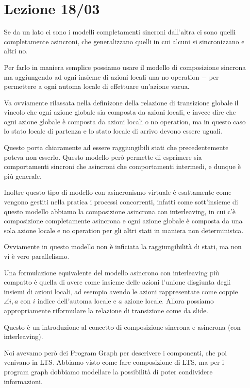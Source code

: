 \chapter{Lezione 18/03}

Se da un lato ci sono i modelli completamenti sincroni dall'altra ci sono quelli completamente asincroni, che generalizzano quelli in cui alcuni si sincronizzano e altri no.

Per farlo in maniera semplice possiamo usare il modello di composizione sincrona ma aggiungendo ad ogni insieme di azioni locali una no operation \(-\) per permettere a ogni automa locale di effettuare un'azione vacua.

Va ovviamente rilassata nella definizone della relazione di transizione globale il vincolo che ogni azione globale sia composta da azioni locali, e invece dire che ogni azione globale è composta da azioni locali o no operation, ma in questo caso lo stato locale di partenza e lo stato locale di arrivo devono essere uguali.

Questo porta chiaramente ad essere raggiungibili stati che precedentemente poteva non esserlo. Questo modello però permette di esprimere sia comportamenti sincroni che asincroni che comportamenti intermedi, e dunque è più generale.

Inoltre questo tipo di modello con asincronismo virtuale è esattamente come vengono gestiti nella pratica i processi concorrenti, infatti come sott'insieme di questo modello abbiamo la composizione asincrona con interleaving, in cui c'è composizione completamente asincrona e ogni azione globale è composta da una sola azione locale e no operation per gli altri stati in maniera non deterministca.

Ovviamente in questo modello non è inficiata la raggiungibilità di stati, ma non vi è vero parallelismo.


Una formulazione equivalente del modello asincrono con interleaving più compatto è quella di avere come insieme delle azioni l'unione disgiunta degli insiemi di azioni locali, ad esempio avendo le azioni rappresentate come coppie \(\angle{i,a}\) con \(i\) indice dell'automa locale e \(a\) azione locale. Allora possiamo appropriamente riformulare la relazione di transizione come da slide.

Questo è un introduzione al concetto di composizione sincrona e asincrona (con interleaving).

Noi avevamo però dei Program Graph per descrivere i componenti, che poi venivano  in LTS. Abbiamo visto come fare composizione di LTS, ma per i program graph dobbiamo modellare la possibilità di poter condividere informazioni.

